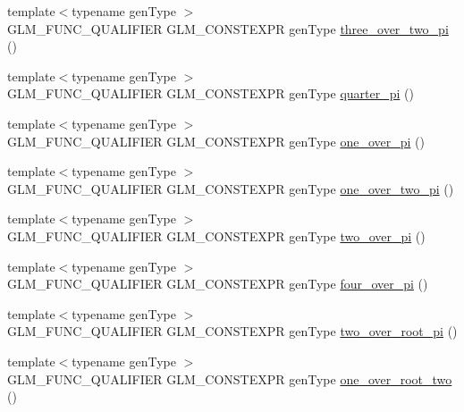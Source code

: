 \begin{DoxyCompactItemize}
{\footnotesize template$<$typename gen\+Type $>$ }\\G\+L\+M\+\_\+\+F\+U\+N\+C\+\_\+\+Q\+U\+A\+L\+I\+F\+I\+E\+R G\+L\+M\+\_\+\+C\+O\+N\+S\+T\+E\+X\+P\+R gen\+Type \hyperlink{group__gtc__constants_gae94950df74b0ce382b1fc1d978ef7394}{three\+\_\+over\+\_\+two\+\_\+pi} ()
\item 
{\footnotesize template$<$typename gen\+Type $>$ }\\G\+L\+M\+\_\+\+F\+U\+N\+C\+\_\+\+Q\+U\+A\+L\+I\+F\+I\+E\+R G\+L\+M\+\_\+\+C\+O\+N\+S\+T\+E\+X\+P\+R gen\+Type \hyperlink{group__gtc__constants_ga3c9df42bd73c519a995c43f0f99e77e0}{quarter\+\_\+pi} ()
\item 
{\footnotesize template$<$typename gen\+Type $>$ }\\G\+L\+M\+\_\+\+F\+U\+N\+C\+\_\+\+Q\+U\+A\+L\+I\+F\+I\+E\+R G\+L\+M\+\_\+\+C\+O\+N\+S\+T\+E\+X\+P\+R gen\+Type \hyperlink{group__gtc__constants_ga555150da2b06d23c8738981d5013e0eb}{one\+\_\+over\+\_\+pi} ()
\item 
{\footnotesize template$<$typename gen\+Type $>$ }\\G\+L\+M\+\_\+\+F\+U\+N\+C\+\_\+\+Q\+U\+A\+L\+I\+F\+I\+E\+R G\+L\+M\+\_\+\+C\+O\+N\+S\+T\+E\+X\+P\+R gen\+Type \hyperlink{group__gtc__constants_ga7c922b427986cbb2e4c6ac69874eefbc}{one\+\_\+over\+\_\+two\+\_\+pi} ()
\item 
{\footnotesize template$<$typename gen\+Type $>$ }\\G\+L\+M\+\_\+\+F\+U\+N\+C\+\_\+\+Q\+U\+A\+L\+I\+F\+I\+E\+R G\+L\+M\+\_\+\+C\+O\+N\+S\+T\+E\+X\+P\+R gen\+Type \hyperlink{group__gtc__constants_ga74eadc8a211253079683219a3ea0462a}{two\+\_\+over\+\_\+pi} ()
\item 
{\footnotesize template$<$typename gen\+Type $>$ }\\G\+L\+M\+\_\+\+F\+U\+N\+C\+\_\+\+Q\+U\+A\+L\+I\+F\+I\+E\+R G\+L\+M\+\_\+\+C\+O\+N\+S\+T\+E\+X\+P\+R gen\+Type \hyperlink{group__gtc__constants_ga753950e5140e4ea6a88e4a18ba61dc09}{four\+\_\+over\+\_\+pi} ()
\item 
{\footnotesize template$<$typename gen\+Type $>$ }\\G\+L\+M\+\_\+\+F\+U\+N\+C\+\_\+\+Q\+U\+A\+L\+I\+F\+I\+E\+R G\+L\+M\+\_\+\+C\+O\+N\+S\+T\+E\+X\+P\+R gen\+Type \hyperlink{group__gtc__constants_ga5827301817640843cf02026a8d493894}{two\+\_\+over\+\_\+root\+\_\+pi} ()
\item 
{\footnotesize template$<$typename gen\+Type $>$ }\\G\+L\+M\+\_\+\+F\+U\+N\+C\+\_\+\+Q\+U\+A\+L\+I\+F\+I\+E\+R G\+L\+M\+\_\+\+C\+O\+N\+S\+T\+E\+X\+P\+R gen\+Type \hyperlink{group__gtc__constants_ga788fa23a0939bac4d1d0205fb4f35818}{one\+\_\+over\+\_\+root\+\_\+two} ()

\end{DoxyCompactItemize}

